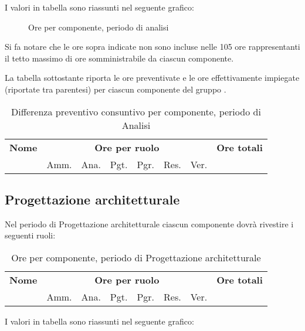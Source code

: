 I valori in tabella sono riassunti nel seguente grafico: \\ 

\begin{figure}[H]
\caption{Ore per componente, periodo di analisi}
\end{figure}

Si fa notare che le ore sopra indicate non sono incluse nelle 105 ore rappresentanti il tetto massimo di ore somministrabile da ciascun componente.

La tabella sottostante riporta le ore preventivate e le ore effettivamente impiegate (riportate tra parentesi) per ciascun componente del gruppo \GroupName{}.

\begin{center}
\begin{table}[H]
\begin{tabular}{lccccccc}
\toprule
    \textbf{Nome}  & \multicolumn{6}{c}{\textbf{Ore per ruolo}} & \textbf{Ore totali} \\
     & Amm. & Ana. & Pgt. & Pgr. & Res. & Ver. & \\
    \midrule
    
    	
    
    \bottomrule
\end{tabular}
\caption{Differenza preventivo consuntivo per componente, periodo di Analisi}
\end{table}
\end{center}

\pagebreak
\subsection{Progettazione architetturale}

Nel periodo di Progettazione architetturale ciascun componente dovrà rivestire i seguenti ruoli:

\begin{table}[H]
\centering
\begin{tabular}{lccccccc}
\toprule 
    \textbf{Nome}  & \multicolumn{6}{c}{\textbf{Ore per ruolo}} & \textbf{Ore totali} \\
     & Amm. & Ana. & Pgt. & Pgr. & Res. & Ver. \\
    \midrule
    
    	
    
    \bottomrule
\end{tabular}
\caption{Ore per componente, periodo di Progettazione architetturale}
\end{table}
I valori in tabella sono riassunti nel seguente grafico: \\ \\ \\

